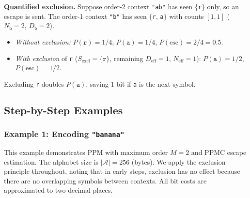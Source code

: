 \begin{examplebox}
\textbf{Quantified exclusion.}
Suppose order-2 context \texttt{"ab"} has seen $\{$\texttt{r}$\}$ only, so an escape
is sent. The order-1 context \texttt{"b"} has seen $\{$\texttt{r}, \texttt{a}$\}$
with counts $[1,1]$ ($N_{\texttt{b}} = 2$, $D_{\texttt{b}} = 2$).
\begin{itemize}
    \item \emph{Without exclusion:} $P(\texttt{r}) = 1/4$,
          $P(\texttt{a}) = 1/4$, $P(\text{esc}) = 2/4 = 0.5$.
    \item \emph{With exclusion} of \texttt{r} ($S_{\mathrm{excl}} = \{\texttt{r}\}$,
          remaining $D_{\mathrm{eff}} = 1$, $N_{\mathrm{eff}} = 1$):
          $P(\texttt{a}) = 1/2$, $P(\text{esc}) = 1/2$.
\end{itemize}
Excluding \texttt{r} doubles $P(\texttt{a})$, saving $1$ bit if \texttt{a} is the
next symbol.
\end{examplebox}

\subsection{Step-by-Step Examples}

\subsubsection{Example 1: Encoding \texttt{"banana"}}

This example demonstrates PPM with maximum order $M=2$ and PPMC escape estimation.
The alphabet size is $|\mathcal{A}| = 256$ (bytes). We apply the exclusion principle throughout, noting that in early steps, exclusion has no effect because there are no overlapping symbols between contexts. All bit costs are approximated to two decimal places.

